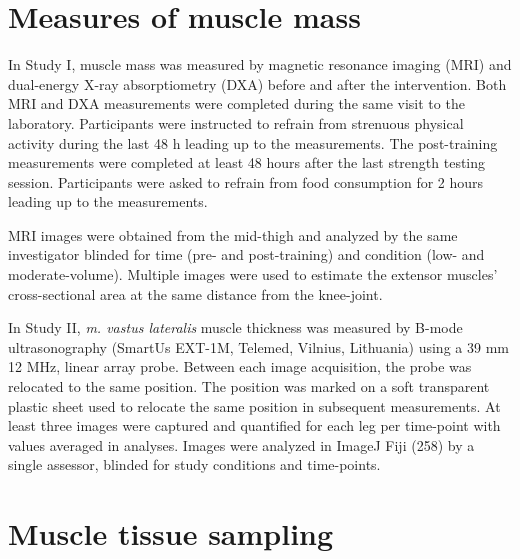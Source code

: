 \documentclass[twoside,10pt]{gihclass} %
\begin{document}
\hypertarget{measures-of-muscle-mass}{%
\section{Measures of muscle mass}\label{measures-of-muscle-mass}}

In Study I, muscle mass was measured by magnetic resonance imaging (MRI)
and dual-energy X-ray absorptiometry (DXA) before and after the
intervention. Both MRI and DXA measurements were completed during the
same visit to the laboratory. Participants were instructed to refrain
from strenuous physical activity during the last 48 h leading up to the
measurements. The post-training measurements were completed at least 48 hours after the last strength testing session. Participants were asked to refrain from food consumption for 2 hours leading up to the measurements.

MRI images were obtained from the mid-thigh and analyzed by the same
investigator blinded for time (pre- and post-training) and condition (low- and moderate-volume). Multiple images were used to estimate the extensor muscles' cross-sectional area at the same distance from
the knee-joint.

In Study II, \emph{m. vastus lateralis} muscle thickness was measured by B-mode ultrasonography (SmartUs EXT-1M, Telemed, Vilnius, Lithuania) using a 39 mm 12 MHz, linear array probe. Between each image acquisition, the probe was relocated to the same position. The position was marked on a soft transparent plastic sheet used to relocate the same position in subsequent measurements.
At least three images were captured and quantified for each leg per time-point with values averaged in analyses. Images were analyzed in ImageJ Fiji (258) by a single assessor, blinded for study conditions and time-points.

\hypertarget{muscle-tissue-sampling}{%
\section{Muscle tissue sampling}\label{muscle-tissue-sampling}}
\end{document}
